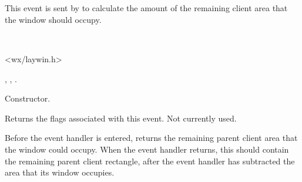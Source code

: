 \section{}\label{wxcalculatelayoutevent}

This event is sent by  to
calculate the amount of the remaining client area that the window should
occupy.


\\


<wx/laywin.h>




\twocolwidtha{7cm}%
\begin{twocollist}\itemsep=0pt
\end{twocollist}


,\rtfsp
{},\rtfsp
{}.


\label{wxcalculatelayouteventctor}


Constructor.

\label{wxcalculatelayouteventgetflags}


Returns the flags associated with this event. Not currently used.

\label{wxcalculatelayouteventgetrect}


Before the event handler is entered, returns the remaining parent client area that the window
could occupy. When the event handler returns, this should contain the remaining parent client rectangle,
after the event handler has subtracted the area that its window occupies.

